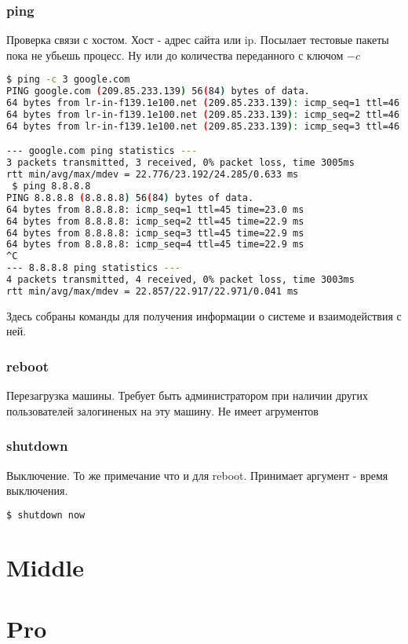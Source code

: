 \documentclass[11pt]{article}
\begin{document}
\subsubsection{ping}
Проверка связи с хостом. Хост - адрес сайта или ip. Посылает тестовые пакеты пока не убьешь процесс. Ну или до количества переданного с ключом $-c$
\begin{lstlisting}[language=bash]
 $ ping -c 3 google.com
PING google.com (209.85.233.139) 56(84) bytes of data.
64 bytes from lr-in-f139.1e100.net (209.85.233.139): icmp_seq=1 ttl=46 time=22.8 ms
64 bytes from lr-in-f139.1e100.net (209.85.233.139): icmp_seq=2 ttl=46 time=24.3 ms
64 bytes from lr-in-f139.1e100.net (209.85.233.139): icmp_seq=3 ttl=46 time=22.8 ms

--- google.com ping statistics ---
3 packets transmitted, 3 received, 0% packet loss, time 3005ms
rtt min/avg/max/mdev = 22.776/23.192/24.285/0.633 ms
 $ ping 8.8.8.8
PING 8.8.8.8 (8.8.8.8) 56(84) bytes of data.
64 bytes from 8.8.8.8: icmp_seq=1 ttl=45 time=23.0 ms
64 bytes from 8.8.8.8: icmp_seq=2 ttl=45 time=22.9 ms
64 bytes from 8.8.8.8: icmp_seq=3 ttl=45 time=22.9 ms
64 bytes from 8.8.8.8: icmp_seq=4 ttl=45 time=22.9 ms
^C
--- 8.8.8.8 ping statistics ---
4 packets transmitted, 4 received, 0% packet loss, time 3003ms
rtt min/avg/max/mdev = 22.857/22.917/22.971/0.041 ms

\end{lstlisting}

Здесь собраны команды для получения информации о системе и взаимодействия с ней.

\subsubsection{reboot}
Перезагрузка машины. Требует быть администратором при наличии других пользователей залогиненых на эту машину. Не имеет агрументов
\subsubsection{shutdown}
Выключение. То же примечание что и для reboot. Принимает аргумент - время выключения.
\begin{lstlisting}[language=bash]
 $ shutdown now
\end{lstlisting}


\section{Middle}
\section{Pro}
\end{document}
